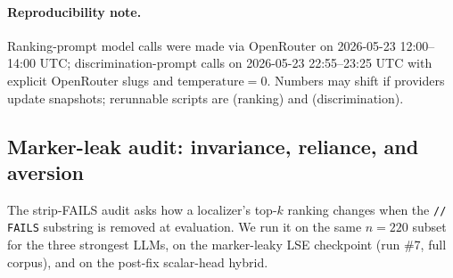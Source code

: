 \documentclass[10pt]{article}
\begin{document}
\paragraph{Reproducibility note.}
Ranking-prompt model calls were made via OpenRouter on 2026-05-23
12:00--14:00 UTC; discrimination-prompt calls on 2026-05-23
22:55--23:25 UTC with explicit OpenRouter slugs and
$\text{temperature}=0$. Numbers may shift if providers update
snapshots; rerunnable scripts are
 (ranking) and
 (discrimination).

\subsection{Marker-leak audit: invariance, reliance, and aversion}
\label{sec:results:llm-marker-audit}

The strip-FAILS audit asks how a localizer's top-$k$ ranking changes
when the \texttt{// FAILS} substring is removed at evaluation. We run
it on the same $n=220$ subset for the three strongest LLMs, on the
marker-leaky LSE checkpoint (run \#7, full corpus), and on the post-fix
scalar-head hybrid.
\end{document}
